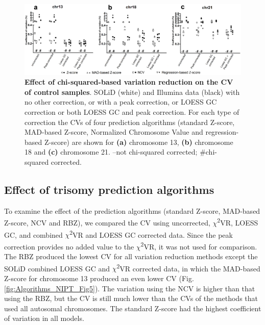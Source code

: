 \begin{figure}
	\includegraphics[width=1.0\linewidth]{img/Algorithms_NIPT_Fig4}
	\caption[Effect of chi-squared-based variation reduction control samples CV.]{\textbf{Effect of chi-squared-based variation reduction on the CV of control samples}. SOLiD (white) and Illumina data (black) with no other correction, or with a peak correction, or LOESS GC correction or both LOESS GC and peak correction. For each type of correction the CVs of four prediction algorithms (standard Z-score, MAD-based Z-score, Normalized Chromosome Value and regression-based Z-score) are shown for \textbf{(a)} chromosome 13, \textbf{(b)} chromosome 18 and \textbf{(c)} chromosome 21. –not chi-squared corrected; \#chi-squared corrected.}
	\label{fig:Algorithms_NIPT_Fig4}
\end{figure}

\subsection{Effect of trisomy prediction algorithms}
To examine the effect of the prediction algorithms (standard Z-score, MAD-based Z-score, NCV and RBZ), we compared the CV using uncorrected, $\chi$\textsuperscript{2}VR, LOESS GC, and combined $\chi$\textsuperscript{2}VR and LOESS GC corrected data. 
Since the peak correction provides no added value to the $\chi$\textsuperscript{2}VR, it was not used for comparison. 
The RBZ produced the lowest CV for all variation reduction methods except the SOLiD combined LOESS GC and $\chi$\textsuperscript{2}VR corrected data, in which the MAD-based Z-score for chromosome 13 produced an even lower CV (Fig. \ref{fig:Algorithms_NIPT_Fig5}). 
The variation using the NCV is higher than that using the RBZ, but the CV is still much lower than the CVs of the methods that used all autosomal chromosomes. 
The standard Z-score had the highest coefficient of variation in all models.


